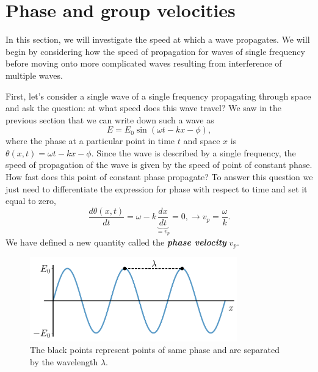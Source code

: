 \section{Phase and group velocities}
\label{sec:6-2_phase_group_velocity}

In this section, we will investigate the speed at which a wave propagates.
We will begin by considering how the speed of propagation for waves of single frequency before moving onto more complicated waves resulting from interference of multiple waves.

First, let's consider a single wave of a single frequency propagating through space and ask the question: at what speed does this wave travel?
We saw in the previous section that we can write down such a wave as
\begin{equation}
    E = E_{0} \sin (\omega t-k x-\phi),
\end{equation}
where the phase at a particular point in time $t$ and space $x$ is $\theta(x,t)=\omega t-k x-\phi$.
Since the wave is described by a single frequency, the speed of propagation of the wave is given by the speed of point of constant phase.
How fast does this point of constant phase propagate?
To answer this question we just need to differentiate the expression for phase with respect to time and set it equal to zero,
\begin{equation}
    \frac{d\theta(x,t)}{d t} = \omega - k\underbrace{\frac{dx}{dt}}_{= v_p} = 0, \longrightarrow v_p = \frac{\omega}{k}.
    \label{eq:6-2_phase_velocity}
\end{equation}
We have defined a new quantity called the \textit{\textbf{phase velocity}} $v_p$.

\begin{figure}[t]
   \centering
    \includegraphics[width=0.8\textwidth]{lesson6/6-2_phase_velocity.pdf}    
        \caption[Phase velocity]{The black points represent points of same phase and are separated by the wavelength $\lambda$.}
        \label{fig:6-2_phase_velocity}
\end{figure}

